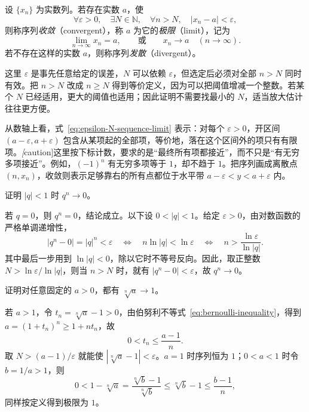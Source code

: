 \begin{definition}
\label{def:sequence-limit}
设 $\{x_n\}$ 为实数列。若存在实数 $a$，使
\begin{equation}
    \forall\varepsilon>0,\quad\exists N\in\mathbb{N},\quad
    \forall n>N,\quad |x_n-a|<\varepsilon,
    \label{eq:epsilon-N-sequence-limit}
\end{equation}
则称序列\emph{收敛}（convergent），称 $a$ 为它的\emph{极限}（limit），记为
\[
    \lim_{n\to\infty}x_n=a,
    \qquad\text{或}\qquad x_n\to a\quad(n\to\infty).
\]
若不存在这样的实数 $a$，则称序列\emph{发散}（divergent）。
\end{definition}

这里 $\varepsilon$ 是事先任意给定的误差，$N$ 可以依赖 $\varepsilon$，但选定后必须对全部 $n>N$ 同时有效。把 $n>N$ 改成 $n\geq N$ 得到等价定义，因为可以把阈值增减一个整数。若某个 $N$ 已经适用，更大的阈值也适用；因此证明不需要找最小的 $N$，适当放大估计往往更方便。

从数轴上看，式~\eqref{eq:epsilon-N-sequence-limit} 表示：对每个 $\varepsilon>0$，开区间 $(a-\varepsilon,a+\varepsilon)$ 包含从某项起的全部项，等价地，落在这个区间外的项只有有限项。\emph[caution]{这里按下标计数，要求的是“最终所有项都接近”，而不只是“有无穷多项接近”。}例如，$(-1)^n$ 有无穷多项等于 $1$，却不趋于 $1$。把序列画成离散点 $(n,x_n)$，收敛则表示足够靠右的所有点都位于水平带 $a-\varepsilon<y<a+\varepsilon$ 内。

\begin{example}
\label{ex:geometric-sequence-limit}
证明 $|q|<1$ 时 $q^n\to0$。
\end{example}

\begin{solve}
若 $q=0$，则 $q^n=0$，结论成立。以下设 $0<|q|<1$。给定 $\varepsilon>0$，由对数函数的严格单调递增性，
\[
    |q^n-0|=|q|^n<\varepsilon
    \quad\Longleftrightarrow\quad
    n\ln|q|<\ln\varepsilon
    \quad\Longleftrightarrow\quad
    n>\frac{\ln\varepsilon}{\ln|q|}.
\]
其中最后一步用到 $\ln|q|<0$，除以它时不等号反向。因此，取正整数 $N>\ln\varepsilon/\ln|q|$，则当 $n>N$ 时，就有 $|q^n-0|<\varepsilon$，故 $q^n\to0$。
\end{solve}

\begin{example}
\label{ex:fixed-root-sequence-limit}
证明对任意固定的 $a>0$，都有 $\sqrt[n]{a}\to1$。
\end{example}

\begin{solve}
若 $a>1$，令 $t_n=\sqrt[n]{a}-1>0$，由伯努利不等式~\eqref{eq:bernoulli-inequality}，得到 $a=(1+t_n)^n\geq1+nt_n$，故
\[
    0<t_n\leq\frac{a-1}{n}.
\]
取 $N>(a-1)/\varepsilon$ 就能使 $|\sqrt[n]{a}-1|<\varepsilon$。$a=1$ 时序列恒为 $1$；$0<a<1$ 时令 $b=1/a>1$，则
\[
    0<1-\sqrt[n]{a}
    =\frac{\sqrt[n]{b}-1}{\sqrt[n]{b}}
    \leq\sqrt[n]{b}-1\leq\frac{b-1}{n},
\]
同样按定义得到极限为 $1$。
\end{solve}


